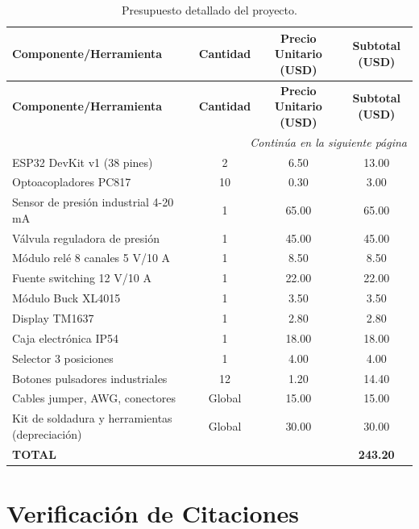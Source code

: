 \begin{longtable}{|l|c|c|c|}
\caption{Presupuesto detallado del proyecto.}
\label{tab:presupuesto}
\\\hline
\textbf{Componente/Herramienta} & \textbf{Cantidad} & \textbf{Precio Unitario (USD)} & \textbf{Subtotal (USD)} \\
\hline
\endfirsthead
\hline
\textbf{Componente/Herramienta} & \textbf{Cantidad} & \textbf{Precio Unitario (USD)} & \textbf{Subtotal (USD)} \\
\hline
\endhead
\hline
\multicolumn{4}{r}{\textit{Continúa en la siguiente página}} \\
\endfoot
\hline
\endlastfoot
ESP32 DevKit v1 (38 pines) & 2 & 6.50 & 13.00 \\
Optoacopladores PC817 & 10 & 0.30 & 3.00 \\
Sensor de presión industrial 4-20 mA & 1 & 65.00 & 65.00 \\
Válvula reguladora de presión & 1 & 45.00 & 45.00 \\
Módulo relé 8 canales 5 V/10 A & 1 & 8.50 & 8.50 \\
Fuente switching 12 V/10 A & 1 & 22.00 & 22.00 \\
Módulo Buck XL4015 & 1 & 3.50 & 3.50 \\
Display TM1637 & 1 & 2.80 & 2.80 \\
Caja electrónica IP54 & 1 & 18.00 & 18.00 \\
Selector 3 posiciones & 1 & 4.00 & 4.00 \\
Botones pulsadores industriales & 12 & 1.20 & 14.40 \\
Cables jumper, AWG, conectores & Global & 15.00 & 15.00 \\
Kit de soldadura y herramientas (depreciación) & Global & 30.00 & 30.00 \\
\hline
\textbf{TOTAL} & & & \textbf{243.20} \\
\hline
\end{longtable}

\section*{Verificación de Citaciones}

